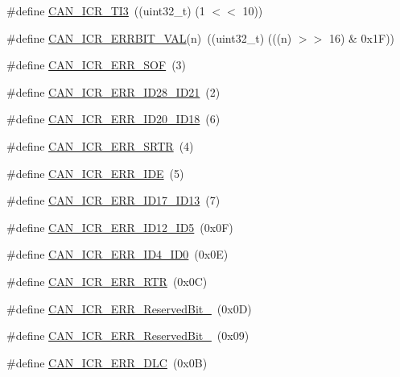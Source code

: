 \begin{DoxyCompactItemize}
\#define \hyperlink{group__CAN__17XX__40XX_ga82d809099125ff45ae2f404eea9113a0}{C\-A\-N\-\_\-\-I\-C\-R\-\_\-\-T\-I3}~((uint32\-\_\-t) (1 $<$$<$ 10))
\item 
\#define \hyperlink{group__CAN__17XX__40XX_ga2688506c7491fa966711cce9ab57c430}{C\-A\-N\-\_\-\-I\-C\-R\-\_\-\-E\-R\-R\-B\-I\-T\-\_\-\-V\-A\-L}(n)~((uint32\-\_\-t) (((n) $>$$>$ 16) \& 0x1\-F))
\item 
\#define \hyperlink{group__CAN__17XX__40XX_ga43d081dee709043e9b2db1830b244efe}{C\-A\-N\-\_\-\-I\-C\-R\-\_\-\-E\-R\-R\-\_\-\-S\-O\-F}~(3)
\item 
\#define \hyperlink{group__CAN__17XX__40XX_gabdfc90bd57b293b818a3ede8d682a69c}{C\-A\-N\-\_\-\-I\-C\-R\-\_\-\-E\-R\-R\-\_\-\-I\-D28\-\_\-\-I\-D21}~(2)
\item 
\#define \hyperlink{group__CAN__17XX__40XX_ga53bcd653d1338f6c146920d1d149d840}{C\-A\-N\-\_\-\-I\-C\-R\-\_\-\-E\-R\-R\-\_\-\-I\-D20\-\_\-\-I\-D18}~(6)
\item 
\#define \hyperlink{group__CAN__17XX__40XX_ga19d41d01d80224aac902c69f5331c733}{C\-A\-N\-\_\-\-I\-C\-R\-\_\-\-E\-R\-R\-\_\-\-S\-R\-T\-R}~(4)
\item 
\#define \hyperlink{group__CAN__17XX__40XX_ga2267eddf693f953aa6069d8c47b16325}{C\-A\-N\-\_\-\-I\-C\-R\-\_\-\-E\-R\-R\-\_\-\-I\-D\-E}~(5)
\item 
\#define \hyperlink{group__CAN__17XX__40XX_ga9e0f491e1db70190987c57c521011267}{C\-A\-N\-\_\-\-I\-C\-R\-\_\-\-E\-R\-R\-\_\-\-I\-D17\-\_\-\-I\-D13}~(7)
\item 
\#define \hyperlink{group__CAN__17XX__40XX_gac6abf275f88e7fbe796e35614280537d}{C\-A\-N\-\_\-\-I\-C\-R\-\_\-\-E\-R\-R\-\_\-\-I\-D12\-\_\-\-I\-D5}~(0x0\-F)
\item 
\#define \hyperlink{group__CAN__17XX__40XX_ga0f52fa1bf8a31f19e4085bc35b5164cd}{C\-A\-N\-\_\-\-I\-C\-R\-\_\-\-E\-R\-R\-\_\-\-I\-D4\-\_\-\-I\-D0}~(0x0\-E)
\item 
\#define \hyperlink{group__CAN__17XX__40XX_gabe25510882df75fa40045dd344b864e9}{C\-A\-N\-\_\-\-I\-C\-R\-\_\-\-E\-R\-R\-\_\-\-R\-T\-R}~(0x0\-C)
\item 
\#define \hyperlink{group__CAN__17XX__40XX_ga6d82f14b8693f6322835ed728975a95c}{C\-A\-N\-\_\-\-I\-C\-R\-\_\-\-E\-R\-R\-\_\-\-Reserved\-Bit\-\_}~(0x0\-D)
\item 
\#define \hyperlink{group__CAN__17XX__40XX_ga01ab782d97f7c4efcad005c2508dae78}{C\-A\-N\-\_\-\-I\-C\-R\-\_\-\-E\-R\-R\-\_\-\-Reserved\-Bit\-\_}~(0x09)
\item 
\#define \hyperlink{group__CAN__17XX__40XX_ga1b69439e74c370c75838c407b277e5c5}{C\-A\-N\-\_\-\-I\-C\-R\-\_\-\-E\-R\-R\-\_\-\-D\-L\-C}~(0x0\-B)

\end{DoxyCompactItemize}
